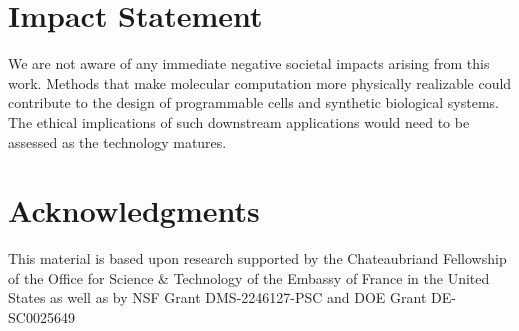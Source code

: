 \documentclass{article}
\theoremstyle{plain}
\theoremstyle{definition}
\theoremstyle{remark}
\newcommand{\<}{\langle}
\renewcommand{\>}{\rangle}
\begin{document}

\clearpage
\section*{Impact Statement}
We are not aware of any immediate negative societal impacts arising from this work. Methods that make molecular computation more physically realizable could contribute to the design of programmable cells and synthetic biological systems. The ethical implications of such downstream applications would need to be assessed as the technology matures.
\section*{Acknowledgments}
This material is based upon research supported by the Chateaubriand Fellowship of the Office for Science \& Technology of the Embassy of France in the United States as well as by NSF Grant DMS-2246127-PSC and DOE Grant DE-SC0025649
\end{document}
